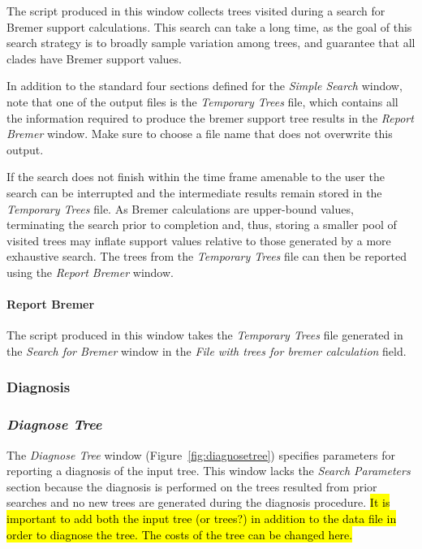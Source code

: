 {The script produced in this window collects trees visited during a search for Bremer support calculations. This
search can take a long time, as the goal of this search strategy is to broadly sample variation among trees, and guarantee that all
clades have Bremer support values. 

In addition to the standard four sections defined for the \emph{Simple Search} window,
note that one of the output files is the \emph{Temporary Trees} file, which 
contains all the information required to produce the bremer support tree
results in the \emph{Report Bremer} window. Make sure to choose a file name that does not overwrite this output.

If the search does not finish within the time frame amenable to the user the search can be interrupted and the intermediate results remain stored in the \emph{Temporary Trees} file.  As Bremer calculations are upper-bound values, terminating the search prior to completion and, thus, storing a smaller pool of visited trees may inflate support values relative to those generated by a more exhaustive search. The trees from the \emph{Temporary Trees} file can then be reported using the \emph{Report Bremer} window.

\paragraph{Report Bremer}
The script produced in this window takes the \emph{Temporary Trees} file generated in the \emph{Search for Bremer} window in the \emph{File with trees for bremer calculation} field. 

\subsubsection{Diagnosis}

\subsubsection*{\emph{Diagnose Tree}}

The \emph{Diagnose Tree} window (Figure~\ref{fig:diagnosetree}) specifies parameters for reporting a diagnosis of the input tree. This window lacks the \emph{Search Parameters} section because the diagnosis is performed on the trees resulted from prior searches and no new trees are generated during the diagnosis procedure. \hl{It is important to add both the input tree (or trees?) in addition to the data file in order to diagnose the tree.  The costs of the tree can be changed here.}

}
